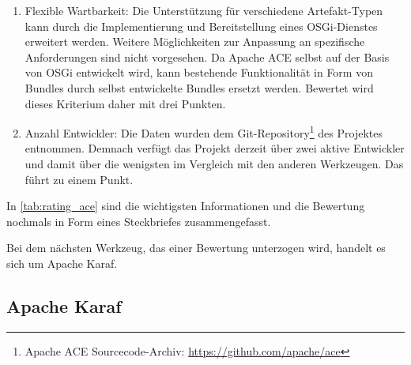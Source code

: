 \begin{enumerate}[label={Nr. \arabic*}, leftmargin=*, labelindent=1em]
 \item Flexible Wartbarkeit:
 Die Unterstützung für verschiedene Artefakt-Typen kann durch die Implementierung und Bereitstellung eines \ac{OSGi}-Dienstes erweitert werden.
 Weitere Möglichkeiten zur Anpassung an spezifische Anforderungen sind nicht vorgesehen. Da Apache ACE selbst auf der Basis von \ac{OSGi} entwickelt wird,
 kann bestehende Funktionalität in Form von Bundles durch selbst entwickelte Bundles ersetzt werden.
 Bewertet wird dieses Kriterium daher mit drei Punkten.
 
 \item Anzahl Entwickler:
 Die Daten wurden dem Git-Repository\footnote{Apache ACE Sourcecode-Archiv: \url{https://github.com/apache/ace}} des Projektes entnommen.
 Demnach verfügt das Projekt derzeit über zwei aktive Entwickler und damit über die wenigsten im Vergleich mit den anderen Werkzeugen.
 Das führt zu einem Punkt.
\end{enumerate}

In \autoref{tab:rating_ace} sind die wichtigsten Informationen und die Bewertung nochmals in Form eines Steckbriefes zusammengefasst.


Bei dem nächsten Werkzeug, das einer Bewertung unterzogen wird, handelt es sich um Apache Karaf.

\subsection{Apache Karaf}

